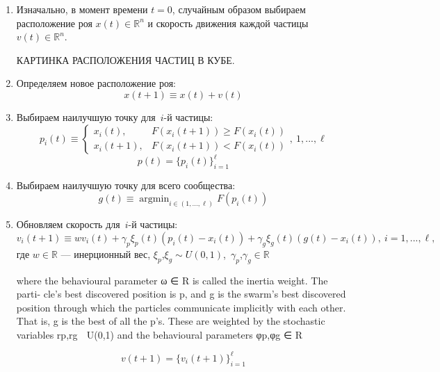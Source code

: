 \begin{enumerate}
	\item Изначально, в момент времени $t=0$, случайным образом выбираем расположение роя $x(t) \in \mathbb{R}^n$ и скорость движения каждой частицы $v(t) \in \mathbb{R}^n$.

	КАРТИНКА РАСПОЛОЖЕНИЯ ЧАСТИЦ В КУБЕ.

	\item Определяем новое расположение роя:
	\[
		x(t + 1) \equiv x(t) + v(t)
	\]

	\item Выбираем наилучшую точку для~$i$-й частицы:
	\[
		p_i(t)
		\equiv
		\begin{cases}
			x_i(t),
			&
			F(x_i(t + 1)) \geq F(x_i(t))
			\\
			x_i(t + 1),
			&
			F(x_i(t + 1)) < F(x_i(t))
		\end{cases}, \ 1, ..., \ell
	\]
	\[
		p(t) = \{p_i(t)\}_{i = 1}^{\ell}
	\]

	\item Выбираем наилучшую точку для всего сообщества:
	\[
		g(t)
		\equiv
		\mathop{\mathrm{argmin}}_{i \in (1, ..., \ell)} \limits F(p_i(t))
	\]

	\item Обновляем скорость для~$i$-й частицы:
	\[
		v_i(t + 1)
		\equiv
		w
		v_i(t)
		+
		\gamma_p
		\xi_p(t)
		(p_i(t) - x_i(t))
		+
		\gamma_g
		\xi_g(t)
		(g(t) - x_i(t)), \
		i = 1, ..., \ell,
	\]
	где $w \in \mathbb{R}$ --- инерционный вес, $\xi_p$,$\xi_g \sim U(0, 1)$,~$\gamma_p$,$\gamma_g \in \mathbb{R}$

where the behavioural parameter ω ∈ R is called the inertia weight. The parti- cle’s best discovered position is p⃗, and ⃗g is the swarm’s best discovered position through which the particles communicate implicitly with each other. That is, ⃗g is the best of all the p⃗’s. These are weighted by the stochastic variables rp,rg ∼ U(0,1) and the behavioural parameters φp,φg ∈ R


	\[
		v(t+1) = \{v_i(t + 1)\}_{i = 1}^{\ell}
	\]

\end{enumerate}






